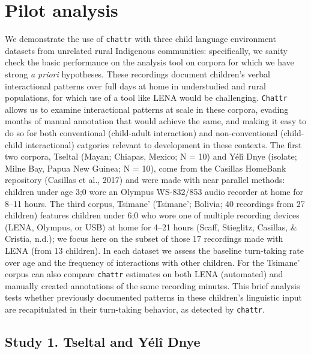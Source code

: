\documentclass[10pt, letterpaper]{article}
\begin{document}
\hypertarget{pilot-analysis}{%
\section{Pilot analysis}\label{pilot-analysis}}

We demonstrate the use of \texttt{chattr} with three child language
environment datasets from unrelated rural Indigenous communities:
specifically, we sanity check the basic performance on the analysis tool
on corpora for which we have strong \emph{a priori} hypotheses. These
recordings document children's verbal interactional patterns over full
days at home in understudied and rural populations, for which use of a
tool like LENA would be challenging. \texttt{Chattr} allows us to
examine interactional patterns at scale in these corpora, evading months
of manual annotation that would achieve the same, and making it easy to
do so for both conventional (child-adult interaction) and
non-conventional (child-child interactional) catgories relevant to
development in these contexts. The first two corpora, Tseltal (Mayan;
Chiapas, Mexico; N = 10) and Yélî Dnye (isolate; Milne Bay, Papua New
Guinea; N = 10), come from the Casillas HomeBank repository (Casillas et
al., 2017) and were made with near parallel methods: children under age
3;0 wore an Olympus WS-832/853 audio recorder at home for 8--11 hours.
The third corpus, Tsimane' (Tsimane'; Bolivia; 40 recordings from 27
children) features children under 6;0 who wore one of multiple recording
devices (LENA, Olympus, or USB) at home for 4--21 hours (Scaff,
Stieglitz, Casillas, \& Cristia, n.d.); we focus here on the subset of
those 17 recordings made with LENA (from 13 children). In each dataset
we assess the baseline turn-taking rate over age and the frequency of
interactions with other children. For the Tsimane' corpus can also
compare \texttt{chattr} estimates on both LENA (automated) and manually
created annotations of the same recording minutes. This brief analysis
tests whether previously documented patterns in these children's
linguistic input are recapitulated in their turn-taking behavior, as
detected by \texttt{chattr}.

\hypertarget{study-1.-tseltal-and-yuxe9luxee-dnye}{%
\subsection{Study 1. Tseltal and Yélî
Dnye}\label{study-1.-tseltal-and-yuxe9luxee-dnye}}
\end{document}

